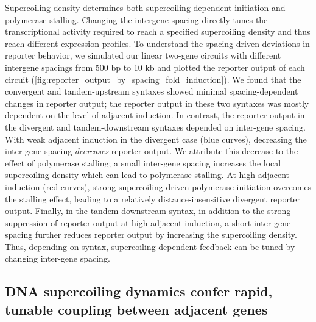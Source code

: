 \documentclass[11pt]{article} %
\begin{document}
Supercoiling density determines both supercoiling-dependent initiation and polymerase stalling. Changing the intergene spacing directly tunes the transcriptional activity required to reach a specified supercoiling density and thus reach different expression profiles. To understand the spacing-driven deviations in reporter behavior, we simulated our linear two-gene circuits with different intergene spacings from 500 bp to 10 kb and plotted the reporter output of each circuit (\cref{fig:reporter_output_by_spacing_fold_induction}). We found that the convergent and tandem-upstream syntaxes showed minimal spacing-dependent changes in reporter output; the reporter output in these two syntaxes was mostly dependent on the level of adjacent induction. In contrast, the reporter output in the divergent and tandem-downstream syntaxes depended on inter-gene spacing. With weak adjacent induction in the divergent case (blue curves), decreasing the inter-gene spacing \emph{decreases} reporter output. We attribute this decrease to the effect of polymerase stalling; a small inter-gene spacing increases the local supercoiling density which can lead to polymerase stalling. At high adjacent induction (red curves), strong supercoiling-driven polymerase initiation overcomes the stalling effect, leading to a relatively distance-insensitive divergent reporter output. Finally, in the tandem-downstream syntax, in addition to the strong suppression of reporter output at high adjacent induction, a short inter-gene spacing further reduces reporter output by increasing the supercoiling density. Thus, depending on syntax, supercoiling-dependent feedback can be tuned by changing inter-gene spacing.


\subsection{DNA supercoiling dynamics confer rapid, tunable coupling between adjacent genes}
\end{document}
